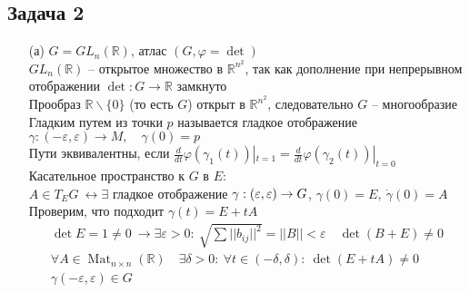 \subsection*{Задача 2}
\begin{enumerate}
\item[(а)]
	$G = GL_n(\mathbb{R})$, атлас $(G, \varphi = \det)$\\
	$GL_n(\mathbb{R})$ -- открытое множество в $\mathbb{R}^{n^2}$, так как дополнение при непрерывном отображении $\det: G \to \mathbb{R}$ замкнуто\\
	Прообраз $\mathbb{R} \backslash \{0\}$ (то есть $G$) открыт в $\mathbb{R}^{n^2}$, следовательно $G$ -- многообразие
	\vskip 0.2in
	Гладким путем из точки $p$ называется гладкое отображение $\gamma: (-\varepsilon, \varepsilon) \to M, \quad \gamma(0) = p$\\
	Пути эквивалентны, если $\frac{d}{dt} \varphi(\gamma_1(t)) |_{t = 1} = \frac{d}{dt} \varphi(\gamma_2(t))|_{t = 0}$
	\vskip 0.2in
	Касательное пространство к $G$ в $E$:\\
	$A \in T_E G\ \leftrightarrow \exists$ гладкое отображение $\gamma: (\-\varepsilon, \varepsilon) \to G$, $\gamma(0) = E,\ \dot{\gamma}(0) = A$\\
	Проверим, что подходит $\gamma(t) = E + tA$
	\begin{gather*}
		\det E = 1 \ne 0\ \rightarrow \exists \varepsilon >0:\ \sqrt{\sum||b_{ij}||^2} = ||B|| < \varepsilon\quad \det(B+E) \ne 0\\
		\forall A \in \operatorname{Mat}_{n \times n}(\mathbb{R})\quad \exists \delta > 0:\ \forall t \in (-\delta, \delta):\ \det(E + tA) \ne 0\\
		\gamma(-\varepsilon, \varepsilon) \in G
	\end{gather*}
	
\begin{comment}
	$GL_n(\mathbb{R}) = \{A \in \operatorname{Mat}_{n\times n}(\mathbb{R})| \det A \ne 0\}$ -- открытое подмножество $\mathbb{R}^{n^2}$:\\
	Определитель матрицы $A$ -- многочлен от коэф. матрицы, непрерывная функция. Тогда, так как $|A| \ne 0$, $A \to \det A$ непрерывное отображение, то есть $\{A\ |\ |A| \ne 0\} \to \mathbb{R}\backslash\{0\}$.\\
	$\mathbb{R}\backslash \{0\}$ открыто, отображение непрерывно, значит прообраз открытого открыт, откуда $\{A\ |\ |A| \ne 0\} \subset \mathbb{R}^{n^2}$ -- открыто в $\mathbb{R}^{n^2}$.\\
	Тогда карта одна и отображение тождественное, а следовательно и гладкое
	\vskip 0.2in
	Касательное пространство:\\
	$\dim TGL_n(\mathbb{R}) = \dim GL_n(\mathbb{R}) = n^2$ и $GL_n(\mathbb{R}) \subset \mathbb{R}^{n^2}$, следовательно касательное пространство является подпространством $\mathbb{R}^{n^2}$, но если размерность подпространства = размерности пространства, то подпространство = пространству, то есть $TGL_n(\mathbb{R}) = \operatorname{Mat}_n(\mathbb{R})$
\end{comment}
	

\end{enumerate}
